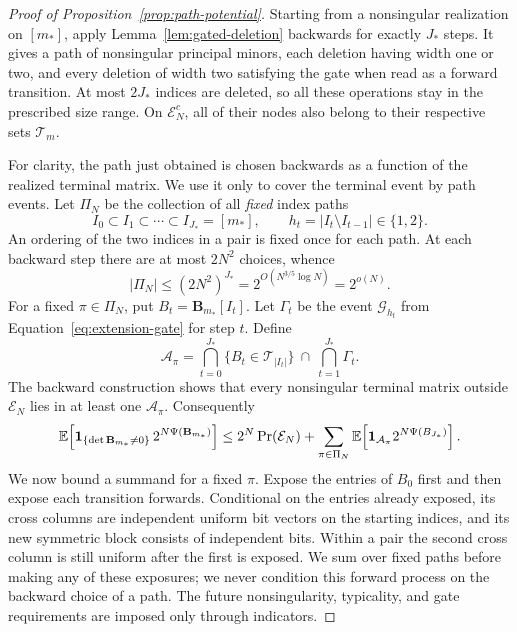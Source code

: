 \begin{proof}[Proof of Proposition~\ref{prop:path-potential}]
Starting from a nonsingular realization on \([m_*]\), apply
Lemma~\ref{lem:gated-deletion} backwards for exactly \(J_*\) steps.
It gives a path of nonsingular principal minors, each deletion having
width one or two, and every deletion of width two satisfying the gate
when read as a forward transition. At most \(2J_*\) indices are
deleted, so all these operations stay in the prescribed size range.
On \(\mathcal E_N^c\), all of their nodes also belong to their
respective sets \(\mathcal T_m\).

For clarity, the path just obtained is chosen backwards as a function
of the realized terminal matrix. We use it only to cover the terminal
event by path events. Let \(\Pi_N\) be the collection of all
\emph{fixed} index paths
\[
 I_0\subset I_1\subset\cdots\subset I_{J_*}=[m_*],
 \qquad h_t=|I_t\setminus I_{t-1}|\in\{1,2\}.
\]
An ordering of the two indices in a pair is fixed once for each path.
At each backward step there are at most \(2N^2\) choices, whence
\[
 |\Pi_N|\le(2N^2)^{J_*}
       =2^{O(N^{3/5}\log N)}=2^{o(N)}.
\]
For a fixed \(\pi\in\Pi_N\), put \(B_t=\mathbf B_{m_*}[I_t]\). Let
\(\Gamma_t\) be the event \(\mathcal G_{h_t}\) from
Equation~\eqref{eq:extension-gate} for step \(t\). Define
\[
 \mathcal A_\pi
   =\bigcap_{t=0}^{J_*}\{B_t\in\mathcal T_{|I_t|}\}
      \ \cap\ \bigcap_{t=1}^{J_*}\Gamma_t.
\]
The backward construction shows that every nonsingular terminal
matrix outside \(\mathcal E_N\) lies in at least one
\(\mathcal A_\pi\). Consequently
\begin{equation}\label{eq:path-cover}
 \mathbb E\!\left[\mathbf 1_{\{\det\mathbf B_{m_*}\ne0\}}\,
                 2^{N\Psi(\mathbf B_{m_*})}\right]
 \le2^N\Pr(\mathcal E_N)
       +\sum_{\pi\in\Pi_N}
          \mathbb E\!\left[\mathbf 1_{\mathcal A_\pi}2^{N\Psi(B_{J_*})}\right].
\end{equation}
We now bound a summand for a fixed \(\pi\). Expose the entries of
\(B_0\) first and then expose each transition forwards. Conditional
on the entries already exposed, its cross columns are independent
uniform bit vectors on the starting indices, and its new symmetric
block consists of independent bits. Within a pair the second cross
column is still uniform after the first is exposed. We sum over fixed
paths before making any of these exposures; we never condition this
forward process on the backward choice of a path. The future
nonsingularity, typicality, and gate requirements are imposed only
through indicators.


\end{proof}
